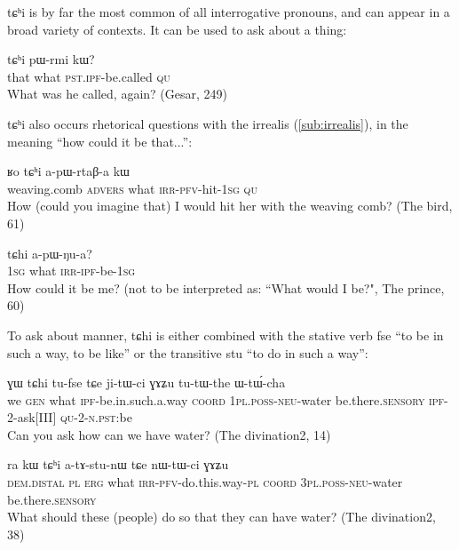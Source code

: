\documentclass[oldfontcommands,oneside,a4paper,11pt]{memoir}
\newcommand{\ipa}[1]{{\phon #1}} %
\newcommand{\coord}{\textsc{coord}}
\newcommand{\dem}{\textsc{dem}}
\newcommand{\erg}{\textsc{erg}}
\newcommand{\gen}{\textsc{gen}}
\newcommand{\ipf}{\textsc{ipf}}
\newcommand{\irr}{\textsc{irr}}
\newcommand{\neu}{\textsc{neu}}
\newcommand{\npst}{\textsc{n.pst}}
\newcommand{\pfv}{\textsc{pfv}}
\newcommand{\pl}{\textsc{pl}}
\newcommand{\poss}{\textsc{poss}}
\newcommand{\pst}{\textsc{pst}}
\newcommand{\sg}{\textsc{sg}}
\begin{document}
 \ipa{tɕʰi} is by far the most common of all interrogative pronouns, and can appear in a broad variety of contexts. It can be used to ask about a thing:


 \begin{exe}
\ex
\gll    \ipa{nɯnɯ} 	\ipa{tɕʰi} 	\ipa{pɯ-rmi} 	\ipa{kɯ?}       \\
that what \pst{}.\ipf{}-be.called \textsc{qu} \\
\glt  What was he called, again? (Gesar, 249)
\end{exe} 
 
 \ipa{tɕʰi} also occurs rhetorical questions with the irrealis (\ref{sub:irrealis}), in the meaning ``how could it be that...'':
 
 \begin{exe}
\ex
\gll   \ipa{tʰaʁɕa} 	\ipa{ʁo} 	\ipa{tɕʰi} 	\ipa{a-pɯ-rtaβ-a} 	\ipa{kɯ} \\
 weaving.comb \textsc{advers} what \irr{}-\pfv{}-hit-1\sg{} \textsc{qu} \\
\glt  How (could you imagine that) I would hit her with the weaving comb? (The bird, 61)
\end{exe} 

  \begin{exe}
\ex
\gll  \ipa{aʑo} 	\ipa{tɕhi} 	\ipa{a-pɯ-ŋu-a?} \\
1\sg{} what \irr{}-\ipf{}-be-1\sg{}  \\
\glt  How could it be me? (not to be interpreted as: ``What would I be?", The prince, 60)
\end{exe} 


To ask about manner, \ipa{tɕhi} is either combined with the stative verb \ipa{fse} ``to be in such a way, to be like'' or the transitive \ipa{stu} ``to do in such a way'':

   \begin{exe}
\ex
\gll  \ipa{iʑɤra} 	\ipa{ɣɯ} 	\ipa{tɕhi} 	\ipa{tu-fse} 	\ipa{tɕe} 	\ipa{ji-tɯ-ci} 	\ipa{ɣɤʑu} 	\ipa{tu-tɯ-the} 	\ipa{ɯ-tɯ́-cha}  \\
we \gen{} what  \ipf{}-be.in.such.a.way \coord{} 1\pl{}.\poss{}-\neu{}-water be.there.\textsc{sensory} \ipf{}-2-ask[III] \textsc{qu}-2-\npst{}:be  \\
\glt  Can you ask how can we have water? (The divination2, 14)
\end{exe} 
 
   \begin{exe}
\ex
\gll  \ipa{nɯnɯ} 	\ipa{ra} 	\ipa{kɯ} 	\ipa{tɕʰi} 	\ipa{a-tɤ-stu-nɯ} 	\ipa{tɕe} 	\ipa{nɯ-tɯ-ci} 	\ipa{ɣɤʑu}   \\
\dem{}.\textsc{distal} \pl{} \erg{} what \irr{}-\pfv{}-do.this.way-\pl{} \coord{} 3\pl{}.\poss{}-\neu{}-water be.there.\textsc{sensory}  \\
\glt  What should these (people) do so that they can have water? (The divination2, 38)
\end{exe} 
\end{document}
